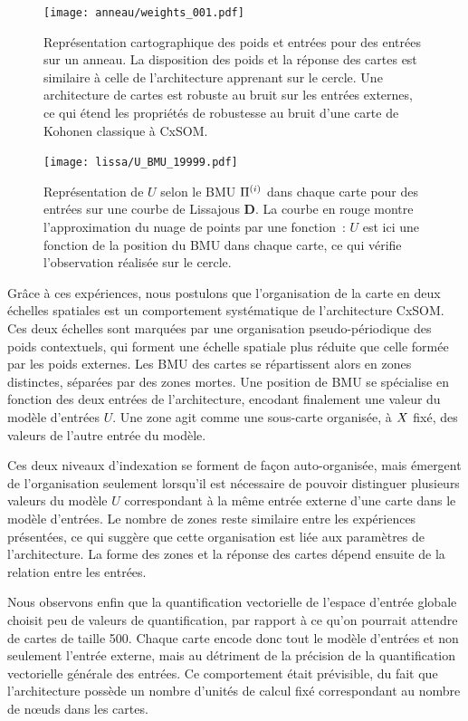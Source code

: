 \documentclass[../main]{subfiles}
\begin{document}
\begin{figure}
\begin{minipage}{\textwidth}
	\centering\texttt{[image: anneau/weights\_001.pdf]}
	\caption{Représentation cartographique des poids et entrées pour des entrées sur un anneau. La disposition des poids et la réponse des cartes est similaire à celle de l'architecture apprenant sur le cercle. Une architecture de cartes est robuste au bruit sur les entrées externes, ce qui étend les propriétés de robustesse au bruit d'une carte de Kohonen classique à CxSOM. \label{fig:anneau_w}}
\end{minipage}
\end{figure}

\begin{figure}[t]
	\centering\texttt{[image: lissa/U\_BMU\_19999.pdf]}
	\caption{Représentation de $U$ selon le BMU $\Pi^{({i})}$ dans chaque carte pour des entrées sur une courbe de Lissajous \textbf{D}. La courbe en rouge montre l'approximation du nuage de points par une fonction~: $U$ est ici une fonction de la position du BMU dans chaque carte, ce qui vérifie l'observation réalisée sur le cercle.\label{fig:u_bmu_lissa}}
\end{figure}


Grâce à ces expériences, nous postulons que l'organisation de la carte en deux échelles spatiales est un comportement systématique de l'architecture CxSOM. 
Ces deux échelles sont marquées par une organisation pseudo-périodique des poids contextuels, qui forment une échelle spatiale plus réduite que celle formée par les poids externes. Les BMU des cartes se répartissent alors en zones distinctes, séparées par des zones mortes.
Une position de BMU se spécialise en fonction des deux entrées de l'architecture, encodant finalement une valeur du modèle d'entrées $U$. 
Une zone agit comme une sous-carte organisée, à $X$ fixé, des valeurs de l'autre entrée du modèle.

Ces deux niveaux d'indexation se forment de façon auto-organisée, mais émergent de l'organisation seulement lorsqu'il est nécessaire de pouvoir distinguer plusieurs valeurs du modèle $U$ correspondant à la même entrée externe d'une carte dans le modèle d'entrées.
Le nombre de zones reste similaire entre les expériences présentées, ce qui suggère que cette organisation est liée aux paramètres de l'architecture. La forme des zones et la réponse des cartes dépend ensuite de la relation entre les entrées.

Nous observons enfin que la quantification vectorielle de l'espace d'entrée globale choisit peu de valeurs de quantification, par rapport à ce qu'on pourrait attendre de cartes de taille 500.
Chaque carte encode donc tout le modèle d'entrées et non seulement l'entrée externe, mais au détriment de la précision de la quantification vectorielle générale des entrées. 
Ce comportement était prévisible, du fait que l'architecture possède un nombre d'unités de calcul fixé correspondant au nombre de n\oe{}uds dans les cartes.
\end{document}
